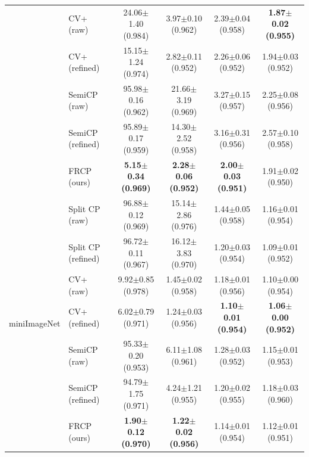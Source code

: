 \begin{table}[t]
\begin{tabular}{llcccc}
 & CV+ (raw) & 24.06$\pm$1.40 {\scriptsize(0.984)} & 3.97$\pm$0.10 {\scriptsize(0.962)} & 2.39$\pm$0.04 {\scriptsize(0.958)} & \textbf{1.87$\pm$0.02 {\scriptsize(0.955)}}\\
 & CV+ (refined) & 15.15$\pm$1.24 {\scriptsize(0.974)} & 2.82$\pm$0.11 {\scriptsize(0.952)} & 2.26$\pm$0.06 {\scriptsize(0.952)} & 1.94$\pm$0.03 {\scriptsize(0.952)}\\
 & SemiCP (raw) & 95.98$\pm$0.16 {\scriptsize(0.962)} & 21.66$\pm$3.19 {\scriptsize(0.969)} & 3.27$\pm$0.15 {\scriptsize(0.957)} & 2.25$\pm$0.08 {\scriptsize(0.956)}\\
 & SemiCP (refined) & 95.89$\pm$0.17 {\scriptsize(0.959)} & 14.30$\pm$2.52 {\scriptsize(0.958)} & 3.16$\pm$0.31 {\scriptsize(0.956)} & 2.57$\pm$0.10 {\scriptsize(0.958)}\\
 & FRCP (ours) & \textbf{5.15$\pm$0.34 {\scriptsize(0.969)}} & \textbf{2.28$\pm$0.06 {\scriptsize(0.952)}} & \textbf{2.00$\pm$0.03 {\scriptsize(0.951)}} & 1.91$\pm$0.02 {\scriptsize(0.950)}\\
\midrule
\multirow{7}{*}{miniImageNet} & Split CP (raw) & 96.88$\pm$0.12 {\scriptsize(0.969)} & 15.14$\pm$2.86 {\scriptsize(0.976)} & 1.44$\pm$0.05 {\scriptsize(0.958)} & 1.16$\pm$0.01 {\scriptsize(0.954)}\\
 & Split CP (refined) & 96.72$\pm$0.11 {\scriptsize(0.967)} & 16.12$\pm$3.83 {\scriptsize(0.970)} & 1.20$\pm$0.03 {\scriptsize(0.954)} & 1.09$\pm$0.01 {\scriptsize(0.952)}\\
 & CV+ (raw) & 9.92$\pm$0.85 {\scriptsize(0.978)} & 1.45$\pm$0.02 {\scriptsize(0.958)} & 1.18$\pm$0.01 {\scriptsize(0.956)} & 1.10$\pm$0.00 {\scriptsize(0.954)}\\
 & CV+ (refined) & 6.02$\pm$0.79 {\scriptsize(0.971)} & 1.24$\pm$0.03 {\scriptsize(0.956)} & \textbf{1.10$\pm$0.01 {\scriptsize(0.954)}} & \textbf{1.06$\pm$0.00 {\scriptsize(0.952)}}\\
 & SemiCP (raw) & 95.33$\pm$0.20 {\scriptsize(0.953)} & 6.11$\pm$1.08 {\scriptsize(0.961)} & 1.28$\pm$0.03 {\scriptsize(0.952)} & 1.15$\pm$0.01 {\scriptsize(0.953)}\\
 & SemiCP (refined) & 94.79$\pm$1.75 {\scriptsize(0.971)} & 4.24$\pm$1.21 {\scriptsize(0.955)} & 1.20$\pm$0.02 {\scriptsize(0.955)} & 1.18$\pm$0.03 {\scriptsize(0.960)}\\
 & FRCP (ours) & \textbf{1.90$\pm$0.12 {\scriptsize(0.970)}} & \textbf{1.22$\pm$0.02 {\scriptsize(0.956)}} & 1.14$\pm$0.01 {\scriptsize(0.954)} & 1.12$\pm$0.01 {\scriptsize(0.951)}\\

\end{tabular}
\end{table}
